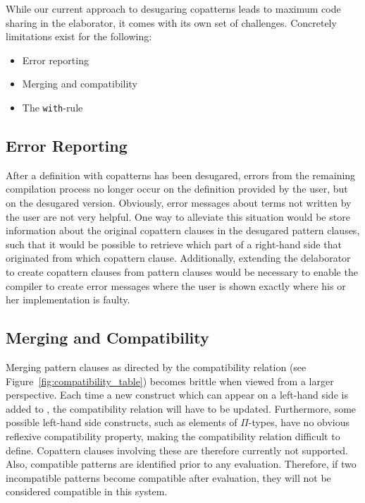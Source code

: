 While our current approach to desugaring copatterns leads to maximum code
sharing in the elaborator, it comes with its own set of challenges. Concretely
limitations exist for the following:

\begin{itemize}
\item Error reporting
\item Merging and compatibility
\item The \texttt{with}-rule
\end{itemize}

\subsection{Error Reporting}
After a definition with copatterns has been desugared, errors from the remaining
compilation process no longer occur on the definition provided by the user, but on the desugared version. Obviously,
error messages about terms not written by the user are not very helpful. One way
to alleviate this situation would be store information about the original
copattern clauses in the desugared pattern clauses, such that it would be possible to
retrieve which part of a right-hand side that originated from which copattern
clause. Additionally, extending the delaborator  to create copattern clauses from
pattern clauses would be necessary to enable the compiler to create error
messages where the user is shown exactly where his or her implementation is faulty.


\subsection{Merging and Compatibility}
\label{sec:merg-comp}
Merging pattern clauses as directed by the compatibility relation (see
Figure~\ref{fig:compatibility_table}) becomes brittle when viewed from a larger
perspective. Each time a new construct which can appear on a left-hand side is
added to \IdrisM{}, the compatibility relation will have to be
updated. Furthermore, some possible left-hand side constructs, such as elements
of $\Pi$-types, have no obvious reflexive compatibility property, making the
compatibility relation difficult to define. Copattern clauses involving these
are therefore currently not supported. Also, compatible patterns are identified prior
to any evaluation. Therefore, if two incompatible patterns become compatible
after evaluation, they will not be considered compatible in this
system.


